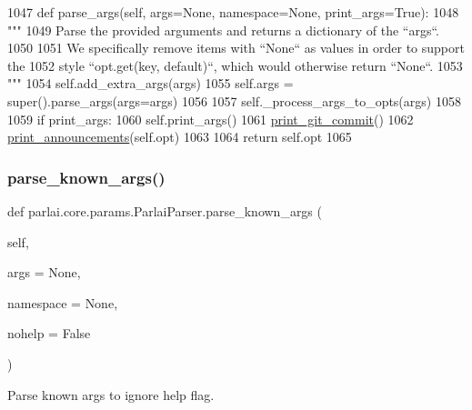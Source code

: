 \begin{DoxyCode}
1047     \textcolor{keyword}{def }parse\_args(self, args=None, namespace=None, print\_args=True):
1048         \textcolor{stringliteral}{"""}
1049 \textcolor{stringliteral}{        Parse the provided arguments and returns a dictionary of the ``args``.}
1050 \textcolor{stringliteral}{}
1051 \textcolor{stringliteral}{        We specifically remove items with ``None`` as values in order to support the}
1052 \textcolor{stringliteral}{        style ``opt.get(key, default)``, which would otherwise return ``None``.}
1053 \textcolor{stringliteral}{        """}
1054         self.add\_extra\_args(args)
1055         self.args = super().parse\_args(args=args)
1056 
1057         self.\_process\_args\_to\_opts(args)
1058 
1059         \textcolor{keywordflow}{if} print\_args:
1060             self.print\_args()
1061             \hyperlink{namespaceparlai_1_1core_1_1params_ac8624bf16ab6b2df0f2869f29a92c90b}{print\_git\_commit}()
1062             \hyperlink{namespaceparlai_1_1core_1_1params_afd1a47c94990168ea9e70d894a79bd2c}{print\_announcements}(self.opt)
1063 
1064         \textcolor{keywordflow}{return} self.opt
1065 
\end{DoxyCode}
\mbox{\label{classparlai_1_1core_1_1params_1_1ParlaiParser_a2a98c07f7393108ad67773951038f191}} 
\subsubsection{\texorpdfstring{parse\+\_\+known\+\_\+args()}{parse\_known\_args()}}
{\footnotesize\ttfamily def parlai.\+core.\+params.\+Parlai\+Parser.\+parse\+\_\+known\+\_\+args (\begin{DoxyParamCaption}\item[{}]{self,  }\item[{}]{args = {\ttfamily None},  }\item[{}]{namespace = {\ttfamily None},  }\item[{}]{nohelp = {\ttfamily False} }\end{DoxyParamCaption})}

\begin{DoxyVerb}Parse known args to ignore help flag.
\end{DoxyVerb}
 

